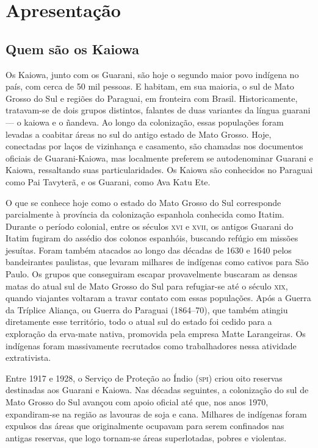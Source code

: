 \chapter{Apresentação}

\section{Quem são os Kaiowa}

Os Kaiowa, junto com os Guarani, são hoje o segundo maior povo indígena
no país, com cerca de 50 mil pessoas. E habitam, em sua maioria, o sul
de Mato Grosso do Sul e regiões do Paraguai, em fronteira com Brasil.
Historicamente, tratavam-se de dois grupos distintos, falantes de duas
variantes da língua guarani --- o kaiowa e o ñandeva. Ao longo da
colonização, essas populações foram levadas a coabitar áreas no
sul do antigo estado de Mato Grosso. Hoje, conectadas por laços de
vizinhança e casamento, são chamadas nos documentos oficiais de
Guarani-Kaiowa, mas localmente preferem se autodenominar Guarani e
Kaiowa, ressaltando suas particularidades. Os Kaiowa são conhecidos no
Paraguai como Pai Tavyterã, e os Guarani, como Ava Katu Ete.

O que se conhece hoje como o estado do Mato Grosso do Sul corresponde
parcialmente à província da colonização espanhola conhecida como Itatim.
Durante o período colonial, entre os séculos \textsc{xvi} e \textsc{xvii}, os antigos
Guarani do Itatim fugiram do assédio dos colonos espanhóis, buscando
refúgio em missões jesuítas. Foram também atacados ao longo das décadas
de 1630 e 1640 pelos bandeirantes paulistas, que levaram milhares de indígenas como cativos para São Paulo. Os grupos que conseguiram escapar
provavelmente buscaram as densas matas do atual sul de Mato Grosso do
Sul para refugiar-se até o século \textsc{xix}, quando viajantes voltaram a
travar contato com essas populações. Após a Guerra da Tríplice Aliança,
ou Guerra do Paraguai (1864--70), que também atingiu diretamente esse
território, todo o atual sul do estado foi cedido para a exploração da
erva-mate nativa, promovida pela empresa Matte Larangeiras. Os indígenas
foram massivamente recrutados como trabalhadores nessa atividade
extrativista.

Entre 1917 e 1928, o Serviço de Proteção ao Índio (\textsc{spi}) criou oito
reservas destinadas aos Guarani e Kaiowa. Nas décadas seguintes, a
colonização do sul de Mato Grosso do Sul avançou com apoio oficial até
que, nos anos 1970, expandiram-se na região as lavouras de soja e cana.
Milhares de indígenas foram expulsos das áreas que originalmente ocupavam
para serem confinados nas antigas reservas, que logo tornam-se áreas
superlotadas, pobres e violentas.

